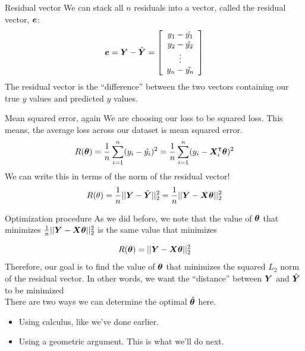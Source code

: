\documentclass[aspectratio=169]{../latex_main/tntbeamer}  %
\begin{document}
	\begin{frame}{Residual vector}
	    We can stack all $n$ residuals into a vector, called the residual vector, $\bm{e}$:
        \begin{equation*}
            \bm{e} = \bm{Y} - \hat{\bm{Y}}  =\left[\begin{array}{c}
                 y_1 - \hat{y_1}\\
                 y_2 - \hat{y_2}\\
                 \vdots\\
                 y_n - \hat{y_n}\\
            \end{array}\right]
        \end{equation*}
        The residual vector is the “difference” between the two vectors containing our true $y$ values and predicted $y$ values. 

	\end{frame}
	
	
	\begin{frame}{Mean squared error, again}
	    We are choosing our loss to be squared loss. This means, the average loss across our dataset is mean squared error.
        \begin{equation*}
            R(\bm{\theta} ) = \frac{1}{n}\sum_{i=1}^n(y_i - \hat{y_i})^2 = \frac{1}{n}\sum_{i=1}^n(y_i - \bm{X}_i^\intercal\bm{\theta})^2
        \end{equation*}
        We can write this in terms of the norm of the residual vector!
        \begin{equation*}
            R(\theta ) = \frac{1}{n}||\bm{Y} - \hat{\bm{Y}}||_2^2 = \frac{1}{n}||\bm{Y} - \bm{X}\bm{\theta}||_2^2
        \end{equation*}
	\end{frame}
	
	
	
	\begin{frame}{Optimization procedure}
	    As we did before, we note that the value of $\bm{\theta}$ that minimizes  $\frac{1}{n}||\bm{Y} - \bm{X}\bm{\theta}||_2^2$                     is the same value that minimizes

        \begin{equation*}
            R(\bm{\theta} ) = ||\bm{Y} - \bm{X}\bm{\theta}||_2^2
        \end{equation*}
        Therefore, our goal is to find the value of     $\bm{\theta}$   that minimizes the squared $L_2$ norm of the residual vector. In other words, we want the “distance” between   $\bm{Y}$   and    $\hat{\bm{Y}}$    to be minimized\\
        \bigskip
        There are two ways we can determine the optimal $\hat{\bm{\theta}}$     here.
        \begin{itemize}
            \item Using calculus, like we’ve done earlier.
            \item Using a geometric argument. This is what we’ll do next.
        \end{itemize}
	\end{frame}
\end{document}
